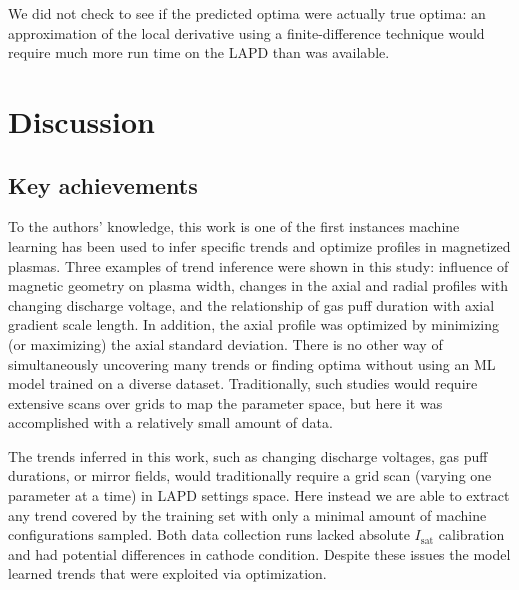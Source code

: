 We did not check to see if the predicted optima were actually true optima: an approximation of the local derivative using a finite-difference technique would require much more run time on the LAPD than was available. 

\section{Discussion}
\label{sec:isat-predict_discussion}

\subsection{Key achievements}

To the authors' knowledge, this work is one of the first instances machine learning has been used to infer specific trends and optimize profiles in magnetized plasmas. Three examples of trend inference were shown in this study: influence of magnetic geometry on plasma width, changes in the axial and radial profiles with changing discharge voltage, and the relationship of gas puff duration with axial gradient scale length. In addition, the axial profile was optimized by minimizing (or maximizing) the axial standard deviation. There is no other way of simultaneously uncovering many trends or finding optima without using an ML model trained on a diverse dataset. Traditionally, such studies would require extensive scans over grids to map the parameter space, but here it was accomplished with a relatively small amount of data.


The trends inferred in this work, such as changing discharge voltages, gas puff durations, or mirror fields, would traditionally require a grid scan (varying one parameter at a time) in LAPD settings space. Here instead we are able to extract any trend covered by the training set with only a minimal amount of machine configurations sampled. Both data collection runs lacked absolute $I_\text{sat}$ calibration and had potential differences in cathode condition. Despite these issues the model learned trends that were exploited via optimization. 


